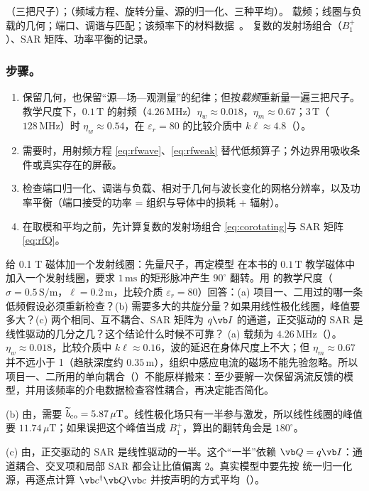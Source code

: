 {（三把尺子）；（频域方程、旋转分量、源的归一化、三种平均）。}
{载频；线圈与负载的几何；端口、调谐与匹配；该频率下的材料数据~\cite{itisdielectric}。}
{复数的发射场组合（$B_1^+$）、SAR 矩阵、功率平衡的记录。}

\subsubsection{步骤。}
\begin{enumerate}
\item 保留几何，也保留“源—场—观测量”的纪律；但按\emph{载频}重新量一遍三把尺子。教学尺度下，$0.1\,\mathrm T$ 的射频（$4.26\,\mathrm{MHz}$）$\eta_w\approx0.018$，$\eta_m\approx0.67$；$3\,\mathrm T$（$128\,\mathrm{MHz}$）时 $\eta_w\approx0.54$，在 $\varepsilon_r=80$ 的比较介质中 $k\ell\approx4.8$（）。
\item 需要时，用射频方程 \eqref{eq:rfwave}、\eqref{eq:rfweak} 替代低频算子；外边界用吸收条件或真实存在的屏蔽。
\item 检查端口归一化、调谐与负载、相对于几何与波长变化的网格分辨率，以及功率平衡（端口接受的功率 = 组织与导体中的损耗 + 辐射）。
\item 在取模和平均之前，先计算复数的发射场组合 \eqref{eq:corotating}与 SAR 矩阵 \eqref{eq:rfQ}。
\end{enumerate}

\begin{example}[label=ex:projects-p5]{给 0.1 T 磁体加一个发射线圈：先量尺子，再定模型}
在本书的 $0.1\,\mathrm T$ 教学磁体中加入一个发射线圈，要求 $1\,\mathrm{ms}$ 的矩形脉冲产生 $90^\circ$ 翻转。用 的教学尺度（$\sigma=0.5\,\mathrm{S/m}$，$\ell=0.2\,\mathrm m$，比较介质 $\varepsilon_r=80$）回答：(a) 项目一、二用过的哪一条低频假设必须重新检查？(b) 需要多大的共旋分量？如果用线性极化线圈，峰值要多大？(c) 两个相同、互不耦合、SAR 矩阵为 $q\vb I$ 的通道，正交驱动的 SAR 是线性驱动的几分之几？这个结论什么时候不可靠？
\solution
(a) 载频为 $4.26\,\mathrm{MHz}$（）。$\eta_w\approx0.018$，比较介质中 $k\ell\approx0.16$，波的延迟在身体尺度上不大；但 $\eta_m\approx0.67$ 并不远小于 1（趋肤深度约 $0.35\,\mathrm m$），组织中感应电流的磁场不能先验忽略。所以项目一、二所用的单向耦合（）不能原样搬来：至少要解一次保留涡流反馈的模型，并用该频率的介电数据检查容性耦合，再决定能否简化。

(b) 由，需要 $\widetilde b_{\rm co}=5.87\,\mu\mathrm T$。线性极化场只有一半参与激发，所以线性线圈的峰值要 $11.74\,\mu\mathrm T$；如果误把这个峰值当成 $B_1^+$，算出的翻转角会是 $180^\circ$。

(c) 由，正交驱动的 SAR 是线性驱动的一半。这个“一半”依赖 $\vb Q=q\vb I$：通道耦合、交叉项和局部 SAR 都会让比值偏离 2。真实模型中要先按 统一归一化源，再逐点计算 $\vb c^\dagger\vb Q\vb c$ 并按声明的方式平均（）。
\end{example}

